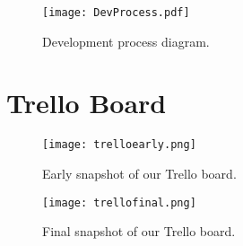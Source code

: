 \begin{figure}[H]
\centering
\texttt{[image: DevProcess.pdf]}
\caption{Development process diagram.}
\end{figure}

\section{Trello Board}

\begin{figure}[H]
\centering
\texttt{[image: trelloearly.png]}
\caption{Early snapshot of our Trello board.}
\end{figure}

\begin{figure}[H]
\centering
\texttt{[image: trellofinal.png]}
\caption{Final snapshot of our Trello board.}
\end{figure}